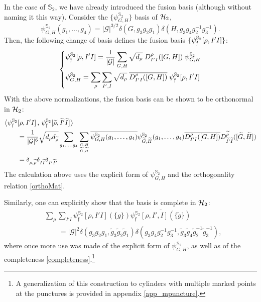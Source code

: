 \documentclass[nofootinbib,superscriptaddress,eqsecnum,tightenlines,11pt]{revtex4-1}
\def\nn{\nonumber}
\def\q{\qquad}
\def\mG{\mathcal{G}}
\def\be{\begin{equation}}
\def\ee{\end{equation}}
\renewcommand{\S}{{\mathbb S}}
\renewcommand{\tilde}{\widetilde}
\begin{document}
In the case of $\S_2$, we have already introduced the fusion basis (although without naming it this way).
Consider the $\{\psi^{\S_2}_{G,H}\}$ basis of ${\cal H}_2$, 
\be
\psi^{\S_2}_{G,H} (g_1, \dots, g_4) = |\mG|^{3/2} \delta(G, g_3 g_2 g_1) \delta(H, g_3 g_4 g_2^{-1} g_3^{-1}).
\ee
Then, the following change of basis defines the fusion basis $\{\psi^{\S_2}_{\frak f} [\rho, I'  I] \}$:
\begin{align}
\begin{dcases}
 \psi^{\S_2}_{\frak f}[\rho,I'I]  = \frac{1}{|\mG|} \sum_{G,H} \sqrt{d_\rho}\;D^\rho_{I'I}([G,H]) \; \psi^{\S_2}_{G,H}  \label{fusbasis}\\
 \psi^{\S_2}_{G,H} =  \sum_{\rho}\sum_{I',I} \sqrt{d_\rho}\;  \overline{D^\rho_{I'I}([G,H])} \;  \psi^{\S_2}_{\frak f}[\rho,I'I]\\
\end{dcases}
\end{align}
With the above normalizations, the fusion basis can be shown to be orthonormal in ${\cal H}_2$:
\begin{align} \nn
	&\big\langle \psi^{\S_2}_{\mathfrak{f}}[\rho,I'I]\, , \,  \psi^{\S_2}_{\mathfrak{f}}[\widetilde{\rho},\tilde{I}'\tilde{I}]\big\rangle \\
	&\q = \frac{1}{|\mathcal{G}|^6}\sqrt{d_{\rho}d_{\widetilde{\rho}}}\sum_{g_1,\dots,g_4}
	\sum_{G,H \atop \widetilde{G},\widetilde{H}}\overline{\psi^{\S_2}_{G,H}(g_1,\dots,g_4)}\psi^{\S_2}_{\widetilde{G},\widetilde{H}}(g_1,\dots,g_4)
	\overline{D^{\rho}_{I'I}([G,H])}D^{\widetilde{\rho}}_{\tilde{I}'\tilde{I}}([\widetilde{G},\widetilde{H}])\nn  \\
	&\q = \delta_{\rho,\widetilde{\rho}}\delta_{I\tilde{I}}\delta_{I'\tilde{I}'}
	\label{orthofus2}
\end{align}
The calculation above uses the explicit form of $\psi^{\S_2}_{G,H}$ and the orthogonality relation \eqref{orthoMat}.

Similarly, one can explicitly show that the basis is complete in ${\cal H}_2$: 
\begin{align}
	&\sum_{\rho}\sum_{I'I}\psi^{\S_2}_{\mathfrak{f}}[\rho,I'I](\{g\}) \overline{\psi^{\S_2}_{\mathfrak{f}}[\rho,I',I](\{\widetilde{g}\})} \nn \\
	& \q = |\mathcal{G}|^2 \delta(g_3g_2g_1,\widetilde{g}_3\widetilde{g}_2\widetilde{g}_1)\delta(g_3g_4g_2^{-1}g_3^{-1},\widetilde{g}_3\widetilde{g}_4\widetilde{g}_2^{-1}\widetilde{g}_3^{-1}),
\end{align}
where once more use was made of the explicit form of $\psi^{\S_2}_{G,H}$, as well as of the completeness \eqref{completeness}.\footnote{ A generalization of this construction to cylinders with multiple marked points at the punctures is provided in appendix \ref{app_mpuncture}.}
\end{document}
